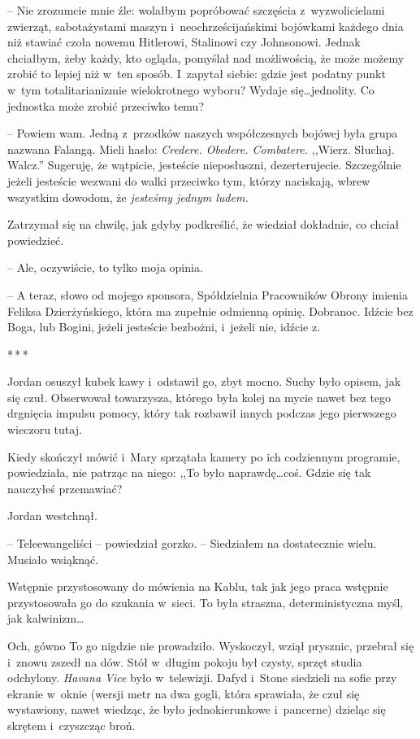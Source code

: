 \documentclass[oneside,polish,11pt,sfheadings]{mwbk}
\newcommand{\threeast}{\bigskip\par\centerline{*\,*\,*}\medskip\par}%
\begin{document}
-- Nie zrozumcie mnie źle: wolałbym popróbować szczęścia z~wyzwolicielami
zwierząt, sabotażystami maszyn i~neochrześcijańskimi bojówkami każdego
dnia niż stawiać czoła nowemu Hitlerowi, Stalinowi czy Johnsonowi.
Jednak chciałbym, żeby każdy, kto ogląda, pomyślał nad możliwością, że
może możemy zrobić to lepiej niż w~ten sposób. I~zapytał siebie: gdzie
jest podatny punkt w~tym totalitarianizmie wielokrotnego wyboru? Wydaje
się\ldots jednolity. Co jednostka może zrobić przeciwko temu?

-- Powiem wam. Jedną z~przodków naszych współczesnych bojówej była grupa
nazwana Falangą. Mieli hasło: \emph{Credere. Obedere. Combatere.}
,,Wierz. Słuchaj. Walcz.'' Sugeruję, że wątpicie, jesteście nieposłuszni,
dezerterujecie. Szczególnie jeżeli jesteście wezwani do walki przeciwko
tym, którzy naciskają, wbrew wszystkim dowodom, że \emph{jesteśmy jednym
ludem.}

Zatrzymał się na chwilę, jak gdyby podkreślić, że wiedział dokładnie, co
chciał powiedzieć.

-- Ale, oczywiście, to tylko moja opinia.

-- A teraz, słowo od mojego sponsora, Spółdzielnia Pracowników Obrony
imienia Feliksa Dzierżyńskiego, która ma zupełnie odmienną opinię.
Dobranoc. Idźcie bez Boga, lub Bogini, jeżeli jesteście bezbożni, i~jeżeli nie, idźcie z.
  \threeast 

Jordan osuszył kubek kawy i~odstawił go, zbyt mocno. Suchy było opisem,
jak się czuł. Obserwował towarzysza, którego była kolej na mycie nawet
bez tego drgnięcia impulsu pomocy, który tak rozbawił innych podczas
jego pierwszego wieczoru tutaj.

Kiedy skończył mówić i~Mary sprzątała kamery po ich codziennym
programie, powiedziała, nie patrząc na niego: ,,To było naprawdę\ldots coś.
Gdzie się tak nauczyłeś przemawiać?

Jordan westchnął. 

-- Teleewangeliści -- powiedział gorzko. -- Siedziałem na
dostatecznie wielu. Musiało wsiąknąć.

Wstępnie przystosowany do mówienia na Kablu, tak jak jego praca wstępnie
przystosowała go do szukania w~sieci. To była straszna, deterministyczna
myśl, jak kalwinizm\ldots

Och, gówno To go nigdzie nie prowadziło. Wyskoczył, wziął prysznic,
przebrał się i~znowu zszedł na dów. Stół w~długim pokoju był czysty,
sprzęt studia odchylony. \emph{Havana Vice} było w~telewizji. Dafyd i~Stone siedzieli na sofie przy ekranie w~oknie (wersji metr na dwa gogli,
która sprawiała, że czuł się wystawiony, nawet wiedząc, że było
jednokierunkowe i~pancerne) dzieląc się skrętem i~czyszcząc broń.
\end{document}
